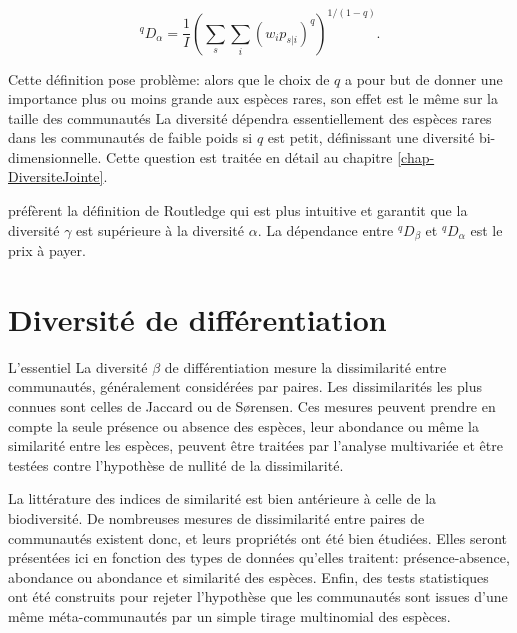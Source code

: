 \documentclass[
  11pt,
  french,
  a4paper,
  extrafontsizes,onecolumn,openright
  ]{memoir}
\newenvironment{Summary}
  {\begin{bclogo}[logo=\bctrombone, noborder=true, couleur=lightgray!50]{L'essentiel}\parindent0pt}
  {\end{bclogo}}
\begin{document}
\begin{equation}
  \label{eq:Chiualpha}
  ^{q}\!D_{\alpha}=\frac{1}{I}{\left(\sum_s{\sum_i{{\left(w_ip_{s|i}\right)}^q}}\right)}^{{1}/{\left(1-q\right)}}.
\end{equation}

Cette définition pose problème: alors que le choix de \(q\) a pour but de donner une importance plus ou moins grande aux espèces rares, son effet est le même sur la taille des communautés La diversité dépendra essentiellement des espèces rares dans les communautés de faible poids si \(q\) est petit, définissant une diversité bi-dimensionnelle.
Cette question est traitée en détail au chapitre \ref{chap-DiversiteJointe}.

\textcite{Marcon2014a} préfèrent la définition de Routledge qui est plus intuitive et garantit que la diversité \(\gamma\) est supérieure à la diversité \(\alpha\).
La dépendance entre \(^{q}\!D_{\beta}\) et \(^{q}\!D_{\alpha}\) est le prix à payer.

\hypertarget{chap-BetaPaires}{%
\chapter{Diversité de différentiation}\label{chap-BetaPaires}}

\scriptsize

\begin{Summary}
La diversité \(\beta\) de différentiation mesure la dissimilarité entre
communautés, généralement considérées par paires. Les dissimilarités les
plus connues sont celles de Jaccard ou de Sørensen. Ces mesures peuvent
prendre en compte la seule présence ou absence des espèces, leur
abondance ou même la similarité entre les espèces, peuvent être traitées
par l'analyse multivariée et être testées contre l'hypothèse de nullité
de la dissimilarité.
\end{Summary}

\normalsize

La littérature des indices de similarité est bien antérieure à celle de la biodiversité.
De nombreuses mesures de dissimilarité entre paires de communautés existent donc, et leurs propriétés ont été bien étudiées.
Elles seront présentées ici en fonction des types de données qu'elles traitent: présence-absence, abondance ou abondance et similarité des espèces.
Enfin, des tests statistiques ont été construits pour rejeter l'hypothèse que les communautés sont issues d'une même méta-communautés par un simple tirage multinomial des espèces.
\end{document}
